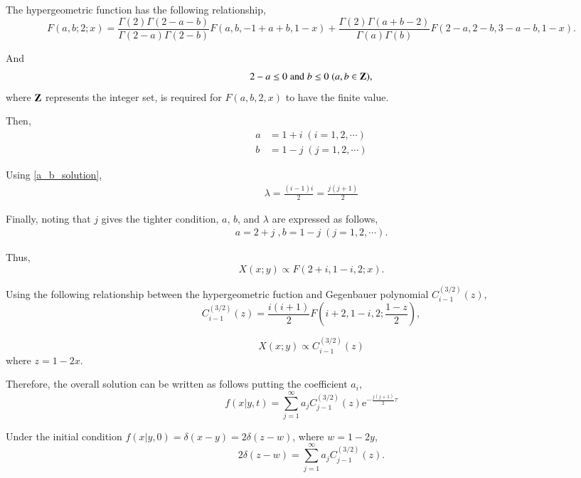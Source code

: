 \documentclass[12pt]{article}
\newcommand{\napier}{\mathrm{e}}
\begin{document}
The hypergeometric function has the following relationship,
\begin{equation}
 F(a,b;2 ; x) = \frac{\Gamma(2) \Gamma(2-a-b)}{\Gamma(2-a) \Gamma(2-b)} F(a,b,-1+a+b, 1-x)
  + \frac{\Gamma(2) \Gamma(a+b-2)}{\Gamma(a) \Gamma(b)} F(2-a,2-b,3-a-b, 1-x).
\end{equation}

And
\begin{equation}
 2-a \leq 0 \; \text{and}\; b \leq 0 \; (a, b \in \bold{Z}),
\end{equation}
where $\bold{Z}$ represents the integer set, is required for $F(a,b,2,x)$ to have the finite value.

Then,
\begin{align}
 a &= 1 + i \; (i=1,2,\cdots)\\
 b &= 1 - j \; (j=1,2,\cdots)
\end{align}

Using \eqref{a_b_solution},
\begin{align}
 \lambda = \frac{(i-1)i}{2} = \frac{j(j+1)}{2}
\end{align}

Finally, noting that $j$ gives the tighter condition, $a$, $b$, and $\lambda$ are expressed as follows,
\begin{align}
 a = 2 + j \;, b = 1 - j \; (j=1,2,\cdots).
\end{align}

Thus,
\begin{equation}
 X(x;y) \propto F(2+i, 1-i, 2; x).
\end{equation}

Using the following relationship between the hypergeometric fuction and Gegenbauer polynomial $C^{(3/2)}_{i-1} (z)$,
\begin{equation}
 C^{(3/2)}_{i-1} (z) = \frac{i(i+1)}{2} F \left(i+2, 1-i, 2;\frac{1-z}{2}\right),
\end{equation}

\begin{equation}
 X(x;y) \propto C^{(3/2)}_{i-1} (z)
\end{equation}
where $z = 1-2x$.

Therefore, the overall solution can be written as follows putting the coefficient $a_i$,
\begin{equation}
 f(x|y,t) = \sum_{j=1}^{\infty} a_j C^{(3/2)}_{j-1} (z) \napier^{-\frac{j(j+1)}{2}\tau}
\end{equation}

Under the initial condition $f(x|y,0) = \delta(x - y) = 2\delta(z-w)$, where $w=1-2y$,
\begin{equation}
 2\delta(z-w) = \sum_{j=1}^{\infty} a_j C^{(3/2)}_{j-1} (z).
\end{equation}
\end{document}
